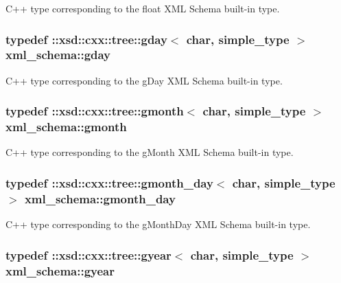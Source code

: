 C++ type corresponding to the float X\+M\+L Schema built-\/in type. 

\hypertarget{namespacexml__schema_a4beba84e7d1a15ea569cad2c7cc2247a}{
\subsubsection[{gday}]{\setlength{\rightskip}{0pt plus 5cm}typedef \+::xsd\+::cxx\+::tree\+::gday$<$ char, {\bf simple\+\_\+type} $>$ {\bf xml\+\_\+schema\+::gday}}}\label{namespacexml__schema_a4beba84e7d1a15ea569cad2c7cc2247a}


C++ type corresponding to the g\+Day X\+M\+L Schema built-\/in type. 

\hypertarget{namespacexml__schema_a1ab06e26cf2c2f3ad971f63c143afd7f}{
\subsubsection[{gmonth}]{\setlength{\rightskip}{0pt plus 5cm}typedef \+::xsd\+::cxx\+::tree\+::gmonth$<$ char, {\bf simple\+\_\+type} $>$ {\bf xml\+\_\+schema\+::gmonth}}}\label{namespacexml__schema_a1ab06e26cf2c2f3ad971f63c143afd7f}


C++ type corresponding to the g\+Month X\+M\+L Schema built-\/in type. 

\hypertarget{namespacexml__schema_aa97adeeeffe50dd9b596b12006c56953}{
\subsubsection[{gmonth\+\_\+day}]{\setlength{\rightskip}{0pt plus 5cm}typedef \+::xsd\+::cxx\+::tree\+::gmonth\+\_\+day$<$ char, {\bf simple\+\_\+type} $>$ {\bf xml\+\_\+schema\+::gmonth\+\_\+day}}}\label{namespacexml__schema_aa97adeeeffe50dd9b596b12006c56953}


C++ type corresponding to the g\+Month\+Day X\+M\+L Schema built-\/in type. 

\hypertarget{namespacexml__schema_ab0d28a4409143544c8f43bbcc1edeac2}{
\subsubsection[{gyear}]{\setlength{\rightskip}{0pt plus 5cm}typedef \+::xsd\+::cxx\+::tree\+::gyear$<$ char, {\bf simple\+\_\+type} $>$ {\bf xml\+\_\+schema\+::gyear}}}\label{namespacexml__schema_ab0d28a4409143544c8f43bbcc1edeac2}


